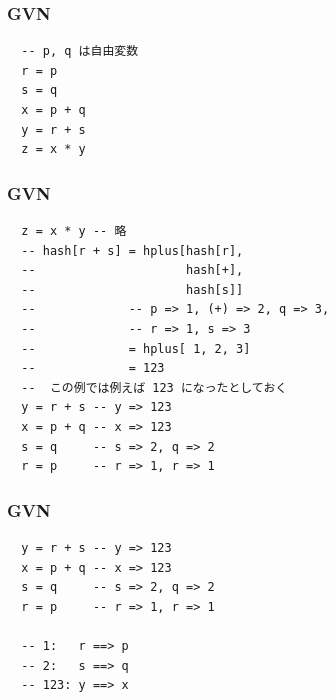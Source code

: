 \documentclass[cjk,dvipdfm,14pt]{beamer}
\begin{document}


\begin{frame}[fragile]
\frametitle{GVN}

\begin{lstlisting}
  -- p, q は自由変数
  r = p
  s = q
  x = p + q
  y = r + s
  z = x * y
\end{lstlisting}

\end{frame}


\begin{frame}[fragile]
\frametitle{GVN}

\begin{lstlisting}
  z = x * y -- 略
  -- hash[r + s] = hplus[hash[r],
  --                     hash[+],
  --                     hash[s]]
  --             -- p => 1, (+) => 2, q => 3,
  --             -- r => 1, s => 3
  --             = hplus[ 1, 2, 3]
  --             = 123
  --  この例では例えば 123 になったとしておく
  y = r + s -- y => 123
  x = p + q -- x => 123
  s = q     -- s => 2, q => 2
  r = p     -- r => 1, r => 1
\end{lstlisting}

\end{frame}


\begin{frame}[fragile]
\frametitle{GVN}

\begin{lstlisting}
  y = r + s -- y => 123
  x = p + q -- x => 123
  s = q     -- s => 2, q => 2
  r = p     -- r => 1, r => 1

  -- 1:   r ==> p
  -- 2:   s ==> q
  -- 123: y ==> x
\end{lstlisting}

\end{frame}
\end{document}
